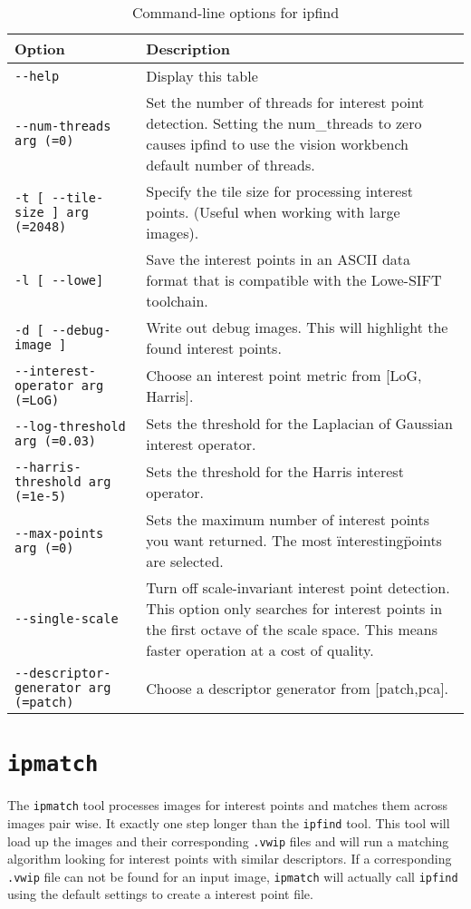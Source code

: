 \begin{longtable}{|l|p{9cm}|}
\caption{Command-line options for ipfind}
\label{tbl:ipfind}
\endfirsthead
\endhead
\endfoot
\endlastfoot
\hline
Option & Description \\ \hline \hline
\verb#--help# & Display this table\\ \hline
\verb#--num-threads arg (=0)# & Set the number of threads for interest point detection. Setting the num\_threads to zero causes ipfind to use the vision workbench default number of threads.\\ \hline
\verb#-t [ --tile-size ] arg (=2048)# & Specify the tile size for processing interest points. (Useful when working with large images).\\ \hline
\verb#-l [ --lowe]# & Save the interest points in an ASCII data format that is compatible with the Lowe-SIFT toolchain.\\ \hline
\verb#-d [ --debug-image ]# & Write out debug images. This will highlight the found interest points.\\ \hline
\verb#--interest-operator arg (=LoG)# & Choose an interest point metric from [LoG, Harris].\\ \hline
\verb#--log-threshold arg (=0.03)# & Sets the threshold for the Laplacian of Gaussian interest operator.\\ \hline
\verb#--harris-threshold arg (=1e-5)# & Sets the threshold for the Harris interest operator.\\ \hline
\verb#--max-points arg (=0)# & Sets the maximum number of interest points you want returned. The most \"interesting\" points are selected.\\ \hline
\verb#--single-scale# & Turn off scale-invariant interest point detection. This option only searches for interest points in the first octave of the scale space. This means faster operation at a cost of quality.\\ \hline
\verb#--descriptor-generator arg (=patch)# & Choose a descriptor generator from [patch,pca].\\ \hline
\end{longtable}


\section{{\tt ipmatch}}\label{sec:ipmatch}
The \verb#ipmatch# tool processes images for interest points and matches them across images pair wise. It exactly one step longer than the \verb#ipfind# tool. This tool will load up the images and their corresponding \verb#.vwip# files and will run a matching algorithm looking for interest points with similar descriptors. If a corresponding \verb#.vwip# file can not be found for an input image, \verb#ipmatch# will actually call \verb#ipfind# using the default settings to create a interest point file.

